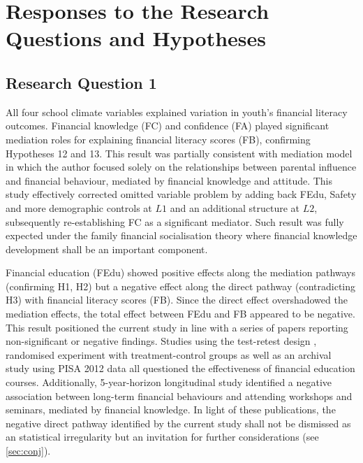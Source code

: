 \section{Responses to the Research Questions and Hypotheses}

\subsection{Research Question 1}

All four school climate variables explained variation in youth's financial literacy outcomes. Financial knowledge (FC) and confidence (FA) played significant mediation roles for explaining financial literacy scores (FB), confirming Hypotheses 12 and 13. This result was partially consistent with  mediation model in which the author focused solely on the relationships between parental influence and financial behaviour, mediated by financial knowledge and attitude. This study effectively corrected  omitted variable problem by adding back FEdu, Safety and more demographic controls at $L1$ and an additional structure at $L2$, subsequently re-establishing FC as a significant mediator. Such result was fully expected under the family financial socialisation theory \parencite{danes:2007} where financial knowledge development shall be an important component.

Financial education (FEdu) showed positive effects along the mediation pathways (confirming H1, H2) but a negative effect along the direct pathway (contradicting H3) with financial literacy scores (FB). Since the direct effect overshadowed the mediation effects, the total effect between FEdu and FB appeared to be negative. This result positioned the current study in line with a series of papers reporting non-significant or negative findings. Studies using the test-retest design \parencite{mandell:2009}, randomised experiment with treatment-control groups \parencite{becchetti:2013, collins:2013} as well as an archival study using PISA 2012 data \parencite{farinella:2017} all questioned the effectiveness of financial education courses. Additionally,  5-year-horizon longitudinal study identified a negative association between long-term financial behaviours and attending workshops and seminars, mediated by financial knowledge. In light of these publications, the negative direct pathway identified by the current study shall not be dismissed as an statistical irregularity but an invitation for further considerations (see \cref{sec:conj}).

